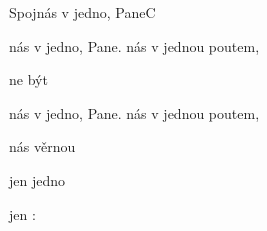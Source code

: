 \begin{song}{Spojnás v jedno, Pane}{C}{}
\begin{SBChorus*}
 nás v jedno, Pane.  nás v jednou poutem, 

 ne být  

 nás v jedno, Pane.   nás v jednou poutem, 

 nás věrnou   

 jen    jedno  

 jen    :
\end{SBChorus*}
\end{song}
\pagebreak
